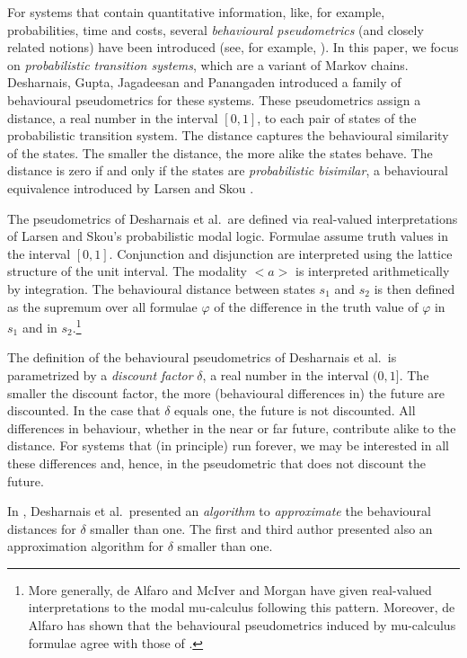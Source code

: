 \documentclass{LMCS}
\begin{document}
For systems that contain quantitative information, like, for example, 
probabilities, time and costs, several {\em behavioural pseudometrics\/} 
(and closely related notions) have been introduced (see, for example, 
\cite{BW05:tcs,B98:dc,CB02:emsoft,AHM03:icalp,DCPP05:qapl,DGJP04:tcs,DHW03:concur,GJS90:ifip,GP05a:dcec,MRST06:tcs,Y02:tcs}).  
In this paper, we focus on {\em probabilistic transition systems},
which are a variant of Markov chains.
Desharnais, Gupta, Jagadeesan and Panangaden \cite{DGJP04:tcs}
introduced a family of behavioural pseudometrics for these systems.  
These pseudometrics assign a distance, a real number in the interval $[0, 1]$,
to each pair of states of the probabilistic transition system.
The distance captures the behavioural similarity of the states.
The smaller the distance, the more alike the states behave.  The
distance is zero if and only if the states are {\em probabilistic bisimilar}, a
behavioural equivalence introduced by Larsen and Skou \cite{LS91:ic}.

The pseudometrics of Desharnais et al.\ are defined via real-valued 
interpretations of Larsen and Skou's probabilistic modal logic.  Formulae 
assume truth values in the interval $[0,1]$.  Conjunction and disjunction 
are interpreted using the lattice structure of the unit interval.  The 
modality $<a>$ is interpreted arithmetically by integration.  The behavioural 
distance between states $s_1$ and $s_2$ is then defined as the supremum over 
all formulae $\varphi$ of the difference in the truth value of $\varphi$ in 
$s_1$ and in $s_2$.\footnote{More generally, de Alfaro \cite{A03:concur} and McIver and
Morgan \cite{MM:tocl} 
have given real-valued interpretations to the modal mu-calculus following 
this pattern.  Moreover, de Alfaro has shown that the behavioural 
pseudometrics induced by mu-calculus formulae agree with those of 
\cite{DGJP04:tcs}.}

The definition of the behavioural pseudometrics of Desharnais et al.\
is para\-metrized by a {\em discount factor\/} $\delta$, a real number in the
interval $(0, 1]$.  The smaller the discount factor, the more (behavioural
differences in) the future are discounted.  In the case that $\delta$
equals one, the future is not discounted.  All differences in behaviour,
whether in the near or far future, contribute alike to the distance.
For systems that (in principle) run forever, we may be interested in all
these differences and, hence, in the pseudometric that does not discount
the future.

In \cite{DGJP99:concur}, Desharnais et al.\ presented an {\em algorithm\/} to
{\em approximate\/} the behavioural distances for $\delta$ smaller than one.
The first and third author \cite{BW06:tcs} presented also an
approximation algorithm for $\delta$ smaller than one.
\end{document}
